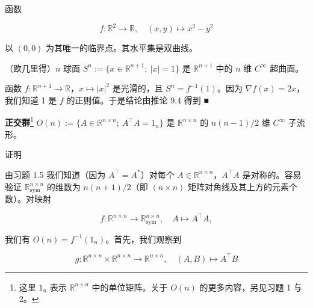 \begin{example}

\begin{items}
\item

函数

\[
f : \mathbb{R}^{2} \to \mathbb{R} , \quad (x, y) \mapsto x^{2} - y^{2}
\]

以 $ (0, 0) $ 为其唯一的临界点。其水平集是双曲线。

\end{items}


\begin{items}
\item[（b）]

（欧几里得）$ n $ 球面 $ S^{n} := \{x \in \mathbb{R}^{n+1} ; \ |x| = 1\} $ 是 $ \mathbb{R}^{n+1} $ 中的 $ n $ 维 $ C^{\infty} $ 超曲面。

\proofhead
函数 $ f : \mathbb{R}^{n+1} \to \mathbb{R} $，$ x \mapsto |x|^{2} $ 是光滑的，且 $ S^{n} = f^{-1}(1) $。因为 $ \nabla f(x) = 2x $，我们知道 1 是 $ f $ 的正则值。于是结论由推论 9.4 得到 \nobreak\hspace{0.35em}■
\item[（c）]

\textbf{正交群}\footnote{这里 $ 1_{n} $ 表示 $ \mathbb{R}^{n \times n} $ 中的单位矩阵。关于 $ O(n) $ 的更多内容，另见习题 1 与 2。} $ O(n) := \{A \in \mathbb{R}^{n \times n} ; \ A^{\top}A = 1_{n}\} $ 是 $ \mathbb{R}^{n \times n} $ 的 $ n(n - 1)/2 $ 维 $ C^{\infty} $ 子流形。

\end{items}

证明

\begin{subitems}
\item

由习题 1.5 我们知道（因为 $ A^{\top} = A^{*} $）对每个 $ A \in \mathbb{R}^{n \times n} $，$ A^{\top}A $ 是对称的。容易验证 $ \mathbb{R}^{n \times n}_{\mathrm{sym}} $ 的维数为 $ n(n + 1)/2 $（即 $ (n \times n) $ 矩阵对角线及其上方的元素个数）。对映射

\[
f : \mathbb{R}^{n \times n} \to \mathbb{R}^{n \times n}_{\mathrm{sym}} , \quad A \mapsto A^{\top}A ,
\]

我们有 $ O(n) = f^{-1}(1_{n}) $。首先，我们观察到

\[
g : \mathbb{R}^{n \times n} \times \mathbb{R}^{n \times n} \to \mathbb{R}^{n \times n} , \quad (A, B) \mapsto A^{\top}B
\]


\end{subitems}
\end{example}
